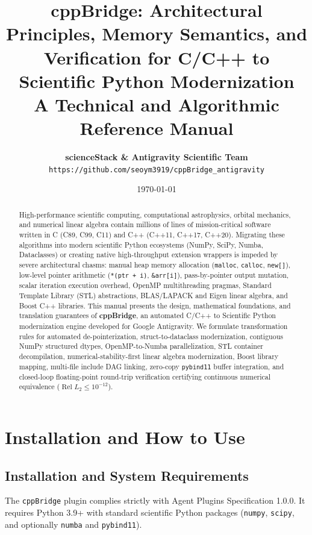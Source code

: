 \documentclass[11pt,a4paper]{article}
\title{\textbf{cppBridge: Architectural Principles, Memory Semantics, and Verification for C/C++ to Scientific Python Modernization}\\[0.5ex]
\large A Technical and Algorithmic Reference Manual}
\author{\textbf{scienceStack \& Antigravity Scientific Team}\\
\texttt{https://github.com/seoym3919/cppBridge\_antigravity}}
\date{\today}
\theoremstyle{definition}
\begin{document}
\maketitle

\begin{abstract}
High-performance scientific computing, computational astrophysics, orbital mechanics, and numerical linear algebra contain millions of lines of mission-critical software written in C (C89, C99, C11) and C++ (C++11, C++17, C++20). Migrating these algorithms into modern scientific Python ecosystems (NumPy, SciPy, Numba, Dataclasses) or creating native high-throughput extension wrappers is impeded by severe architectural chasms: manual heap memory allocation (\texttt{malloc}, \texttt{calloc}, \texttt{new[]}), low-level pointer arithmetic (\texttt{*(ptr + i)}, \texttt{\&arr[i]}), pass-by-pointer output mutation, scalar iteration execution overhead, OpenMP multithreading pragmas, Standard Template Library (STL) abstractions, BLAS/LAPACK and Eigen linear algebra, and Boost C++ libraries. This manual presents the design, mathematical foundations, and translation guarantees of \textbf{cppBridge}, an automated C/C++ to Scientific Python modernization engine developed for Google Antigravity. We formulate transformation rules for automated de-pointerization, struct-to-dataclass modernization, contiguous NumPy structured dtypes, OpenMP-to-Numba parallelization, STL container decompilation, numerical-stability-first linear algebra modernization, Boost library mapping, multi-file include DAG linking, zero-copy \texttt{pybind11} buffer integration, and closed-loop floating-point round-trip verification certifying continuous numerical equivalence ($\operatorname{Rel } L_2 \le 10^{-12}$).
\end{abstract}

\tableofcontents
\newpage

\section{Installation and How to Use}

\subsection{Installation and System Requirements}
The \texttt{cppBridge} plugin complies strictly with Agent Plugins Specification 1.0.0. It requires Python 3.9+ with standard scientific Python packages (\texttt{numpy}, \texttt{scipy}, and optionally \texttt{numba} and \texttt{pybind11}).
\end{document}
